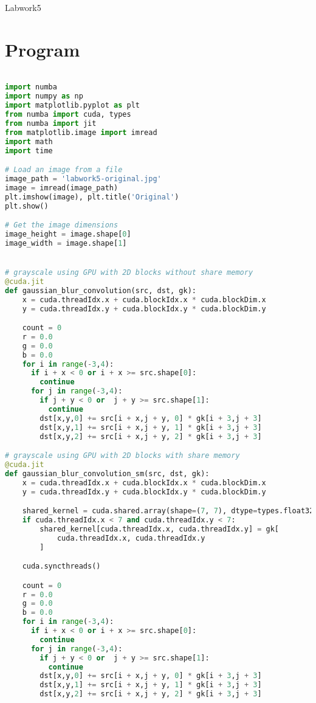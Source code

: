 \documentclass[12pt]{article}
\begin{document}
\begin{center}
    \vspace*{1.8cm}
    \Large
    Labwork5\\
\end{center}

\section{Program}
\begin{lstlisting}[language=Python]

import numba
import numpy as np
import matplotlib.pyplot as plt
from numba import cuda, types
from numba import jit
from matplotlib.image import imread
import math
import time

# Load an image from a file
image_path = 'labwork5-original.jpg'
image = imread(image_path)
plt.imshow(image), plt.title('Original')
plt.show()

# Get the image dimensions
image_height = image.shape[0]
image_width = image.shape[1]


# grayscale using GPU with 2D blocks without share memory
@cuda.jit
def gaussian_blur_convolution(src, dst, gk):
    x = cuda.threadIdx.x + cuda.blockIdx.x * cuda.blockDim.x
    y = cuda.threadIdx.y + cuda.blockIdx.y * cuda.blockDim.y

    count = 0
    r = 0.0
    g = 0.0
    b = 0.0
    for i in range(-3,4):
      if i + x < 0 or i + x >= src.shape[0]:
        continue
      for j in range(-3,4):
        if j + y < 0 or  j + y >= src.shape[1]:
          continue
        dst[x,y,0] += src[i + x,j + y, 0] * gk[i + 3,j + 3]
        dst[x,y,1] += src[i + x,j + y, 1] * gk[i + 3,j + 3]
        dst[x,y,2] += src[i + x,j + y, 2] * gk[i + 3,j + 3]

# grayscale using GPU with 2D blocks with share memory
@cuda.jit
def gaussian_blur_convolution_sm(src, dst, gk):
    x = cuda.threadIdx.x + cuda.blockIdx.x * cuda.blockDim.x
    y = cuda.threadIdx.y + cuda.blockIdx.y * cuda.blockDim.y

    shared_kernel = cuda.shared.array(shape=(7, 7), dtype=types.float32)
    if cuda.threadIdx.x < 7 and cuda.threadIdx.y < 7:
        shared_kernel[cuda.threadIdx.x, cuda.threadIdx.y] = gk[
            cuda.threadIdx.x, cuda.threadIdx.y
        ]

    cuda.syncthreads()

    count = 0
    r = 0.0
    g = 0.0
    b = 0.0
    for i in range(-3,4):
      if i + x < 0 or i + x >= src.shape[0]:
        continue
      for j in range(-3,4):
        if j + y < 0 or  j + y >= src.shape[1]:
          continue
        dst[x,y,0] += src[i + x,j + y, 0] * gk[i + 3,j + 3]
        dst[x,y,1] += src[i + x,j + y, 1] * gk[i + 3,j + 3]
        dst[x,y,2] += src[i + x,j + y, 2] * gk[i + 3,j + 3]



\end{lstlisting}
\end{document}

